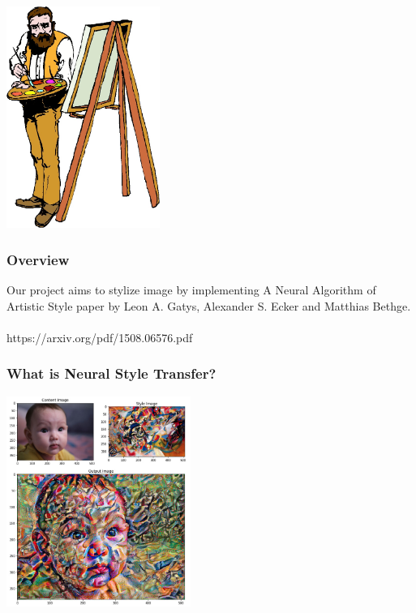 \documentclass[14pt]{beamer}
\begin{document}
\begin{frame}
    \begin{center}
        \includegraphics[width=50mm]{paints.jpg}
    \end{center}
\end{frame}

\begin{frame}
		\frametitle{Overview}
		Our project aims to stylize image by implementing A Neural Algorithm of Artistic Style paper by Leon A. Gatys, Alexander S. Ecker and Matthias Bethge. \\~\\

		https://arxiv.org/pdf/1508.06576.pdf
\end{frame}

\begin{frame}
    \frametitle{What is Neural Style Transfer?}
    \begin{center}
        \includegraphics[width=60mm]{baby.jpeg}
    \end{center}
\end{frame}
\end{document}
